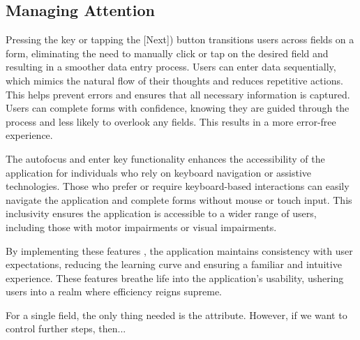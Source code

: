 
\subsection{Managing Attention}

Pressing the  key or tapping the \key{$\rightarrow$} [Next]) button transitions users across fields on a 
form, eliminating the need to manually click or tap on the desired field and resulting in a smoother data entry process. 
Users can enter data sequentially, which mimics the natural flow of their thoughts and reduces repetitive actions. This 
helps prevent errors and ensures that all necessary information is captured. Users can complete forms with confidence, 
knowing they are guided through the process and less likely to overlook any fields. This results in a more error-free 
experience.

The autofocus and enter key functionality enhances the accessibility of the application for individuals who rely on 
keyboard navigation or assistive technologies. Those who prefer or require keyboard-based interactions can easily 
navigate the application and complete forms without mouse or touch input. This inclusivity ensures the application is 
accessible to a wider range of users, including those with motor impairments or visual impairments.

By implementing these features , the application maintains consistency with user expectations, reducing the 
learning curve and ensuring a familiar and intuitive experience. These features breathe life into the application's 
usability, ushering users into a realm where efficiency reigns supreme.

For a single field, the only thing needed is the  attribute. However, if we want to control further 
steps, then...

